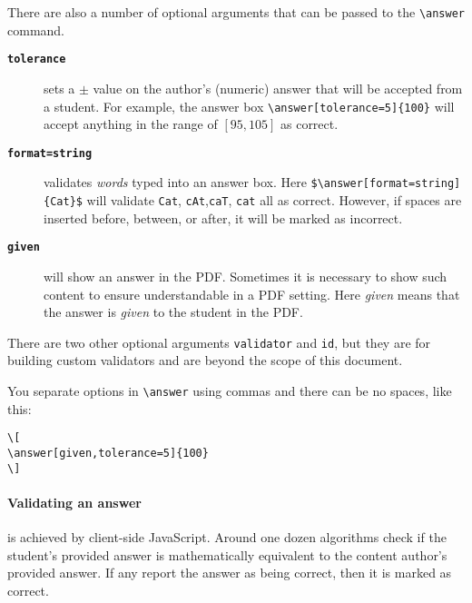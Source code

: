 \documentclass{ximera}
\begin{document}
There are also a number of optional arguments that can be passed
to the \verb|\answer| command.
\begin{description}
  \item[\tt\bfseries tolerance] sets a $\pm$ value on the
    author's (numeric) answer that will be accepted from a student. For
    example,
    the answer box \verb|\answer[tolerance=5]{100}| will accept anything in
    the range of $[95,105]$ as correct.
  \item[\tt\bfseries format=string] validates \textit{words} typed into an
    answer box. Here \verb|$\answer[format=string]{Cat}$| will validate
    \verb!Cat!,
    \verb!cAt!,\verb!caT!, \verb!cat! all as
    correct. However, if spaces are inserted before, between, or after, it will
    be marked as incorrect.
  \item[\tt\bfseries given] will show an answer in the PDF. Sometimes it is
    necessary to
    show such content to ensure
    understandable in a PDF setting. Here \textit{given} means
    that the answer is \textit{given} to the student in the PDF.
\end{description}
There are two other optional arguments \verb!validator! and \verb!id!, but they
are for building custom validators and are beyond the scope of this document.

\begin{warning}
  You separate options in \verb!\answer! using commas and there can be no
  spaces, like this:
  \begin{verbatim}
\[
\answer[given,tolerance=5]{100}
\]
\end{verbatim}
\end{warning}

\paragraph{Validating an answer} is achieved by client-side JavaScript. Around
one dozen algorithms check if the student's provided
answer is mathematically equivalent to the content author's provided answer. If
any report the answer as being correct, then it is marked as correct.
\end{document}
